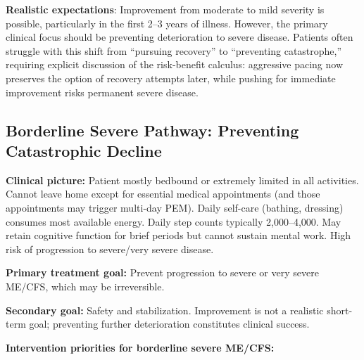 \textbf{Realistic expectations}: Improvement from moderate to mild severity is possible, particularly in the first 2--3 years of illness. However, the primary clinical focus should be preventing deterioration to severe disease. Patients often struggle with this shift from ``pursuing recovery'' to ``preventing catastrophe,'' requiring explicit discussion of the risk-benefit calculus: aggressive pacing now preserves the option of recovery attempts later, while pushing for immediate improvement risks permanent severe disease.

\subsection{Borderline Severe Pathway: Preventing Catastrophic Decline}
\label{sec:pathway-borderline-severe}

\begin{keypoint}
\textbf{Clinical picture:} Patient mostly bedbound or extremely limited in all activities. Cannot leave home except for essential medical appointments (and those appointments may trigger multi-day PEM). Daily self-care (bathing, dressing) consumes most available energy. Daily step counts typically 2,000--4,000. May retain cognitive function for brief periods but cannot sustain mental work. High risk of progression to severe/very severe disease.

\textbf{Primary treatment goal:} Prevent progression to severe or very severe ME/CFS, which may be irreversible.

\textbf{Secondary goal:} Safety and stabilization. Improvement is not a realistic short-term goal; preventing further deterioration constitutes clinical success.
\end{keypoint}

\textbf{Intervention priorities for borderline severe ME/CFS:}

